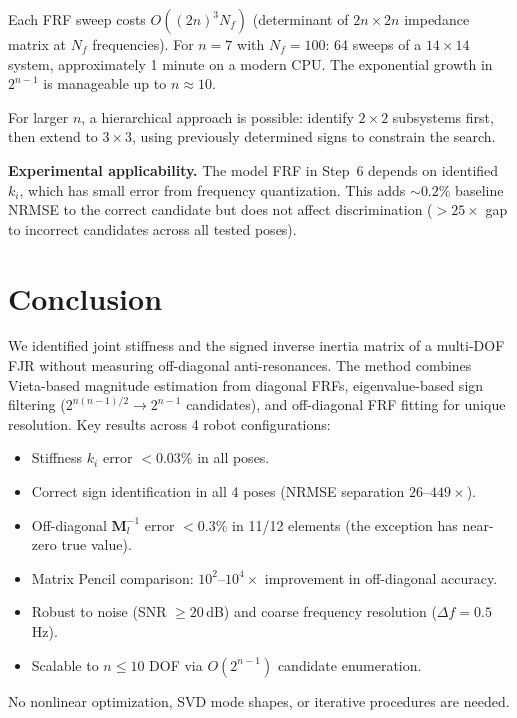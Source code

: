 \documentclass[10pt,twocolumn]{article}
\begin{document}
Each FRF sweep costs $O((2n)^3 N_f)$ (determinant of $2n \times 2n$ impedance matrix at $N_f$ frequencies). For $n=7$ with $N_f=100$: 64 sweeps of a $14\times 14$ system, approximately 1 minute on a modern CPU. The exponential growth in $2^{n-1}$ is manageable up to $n \approx 10$.

For larger $n$, a hierarchical approach is possible: identify $2\times 2$ subsystems first, then extend to $3\times 3$, using previously determined signs to constrain the search.

\textbf{Experimental applicability.} The model FRF in Step~6 depends on identified $k_i$, which has small error from frequency quantization. This adds ${\sim}0.2\%$ baseline NRMSE to the correct candidate but does not affect discrimination ($>25\times$ gap to incorrect candidates across all tested poses).

\section{Conclusion}

We identified joint stiffness and the signed inverse inertia matrix of a multi-DOF FJR without measuring off-diagonal anti-resonances. The method combines Vieta-based magnitude estimation from diagonal FRFs, eigenvalue-based sign filtering ($2^{n(n-1)/2} \to 2^{n-1}$ candidates), and off-diagonal FRF fitting for unique resolution. Key results across 4 robot configurations:

\begin{itemize}
\item Stiffness $k_i$ error $<0.03\%$ in all poses.
\item Correct sign identification in all 4 poses (NRMSE separation $26$--$449\times$).
\item Off-diagonal $\bm{M}_l^{-1}$ error $<0.3\%$ in 11/12 elements (the exception has near-zero true value).
\item Matrix Pencil comparison: $10^2$--$10^4\times$ improvement in off-diagonal accuracy.
\item Robust to noise (SNR $\geq 20$\,dB) and coarse frequency resolution ($\Delta f = 0.5$\,Hz).
\item Scalable to $n \leq 10$ DOF via $O(2^{n-1})$ candidate enumeration.
\end{itemize}

No nonlinear optimization, SVD mode shapes, or iterative procedures are needed.
\end{document}
